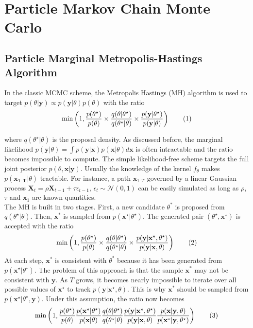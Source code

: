 \documentclass[11pt,a4,twosided,singlespacing,titlepagenumber=on]{scrreprt}
\numberwithin{equation}{chapter} %
\theoremstyle{remark}
\newcommand{\matr}[1]{\mathbf{#1}}
\newcommand\numberthis{\addtocounter{equation}{1}\tag{\theequation}}
\begin{document}
\section{Particle Markov Chain Monte Carlo}
\subsection{Particle Marginal Metropolis-Hastings Algorithm}
\label{section:mcmc_pmmh}

In the classic MCMC scheme, the Metropolis Hastings (MH) algorithm is used to target $p(\theta| \matr{y}) \propto p(\matr{y}|\theta)p(\theta)$ with the ratio
\begin{align*}
\min \left( 1, \frac{p(\theta^\star)}{p(\theta)} \times  \frac{q(\theta|\theta^\star)}{q(\theta^\star|\theta)} \times \frac{p({\matr{y}}|\theta^\star)}{p({\matr{y}}|\theta)} \right) \numberthis \label{classic_mcmc_target}
\end{align*}

where $q(\theta^\star|\theta)$ is the proposal density. As discussed before, the marginal likelihood $p(\matr{y}|\theta) = \int p(\matr{y}|\matr{x})p(\matr{x}|\theta) d\matr{x}$ is often intractable and the ratio becomes impossible to compute. The simple likelihood-free scheme targets the full joint posterior $p(\theta,\matr{x}|\matr{y})$. Usually the knowledge of the kernel $f_\theta$ makes $p(\matr{x_{1:T}}|\theta)$ tractable. For instance, a path $\matr{x}_{1:T}$ governed by a linear Gaussian process $\matr{X}_t = \rho \matr{X}_{t-1} + \tau \epsilon_{t-1} \text{, } \epsilon_t \sim \mathcal{N}(0,1)$ can be easily simulated as long as $\rho$, $\tau$ and $\matr{x}_1$ are known quantities. \\ 

The MH is built in two stages. First, a new candidate $\theta^*$ is proposed from $q(\theta^\star|\theta)$. Then, $\matr{x}^*$ is sampled from $p(\matr{x}^\star|\theta^\star)$. The generated pair $(\theta^\star,\matr{x}^\star)$ is accepted with the ratio
\begin{align*}
\min \left( 1, \frac{p(\theta^\star)}{p(\theta)} \times  \frac{q(\theta|\theta^\star)}{q(\theta^\star|\theta)} \times \frac{p(\matr{y}|{\matr{x}}^\star,\theta^\star)}{p(\matr{y}|{\matr{x}},\theta)} \right) \numberthis
\end{align*}
At each step, $\matr{x}^*$ is consistent with $\theta^*$ because it has been generated from $p(\matr{x}^\star|\theta^\star)$. The problem of this approach is that the sample $\matr{x}^*$ may not be consistent with $\matr{y}$. As $T$ grows, it becomes nearly impossible to iterate over all possible values of $\matr{x}^\star$ to track $p(\matr{y}|\matr{x}^\star,\theta)$. This is why $\matr{x}^*$ should be sampled from $p(\matr{x}^\star|\theta^\star,\matr{y})$. Under this assumption, the ratio now becomes
\begin{align*}
 \min \left(1, \frac{p(\theta^\star)}{p(\theta)}   \frac{p({\matr{x}}^\star|\theta^\star)}{p({\matr{x}}|\theta)}   \frac{q(\theta|\theta^\star)}{q(\theta^\star|\theta)}   \frac{p(\matr{y}|{\matr{x}}^\star,\theta^\star)}{p(\matr{y}|{\matr{x}},\theta)}  \frac{p({\matr{x}}|\matr{y},\theta)}{p({\matr{x}}^\star|\matr{y},\theta^\star)} \right) \numberthis
\end{align*}
\end{document}
